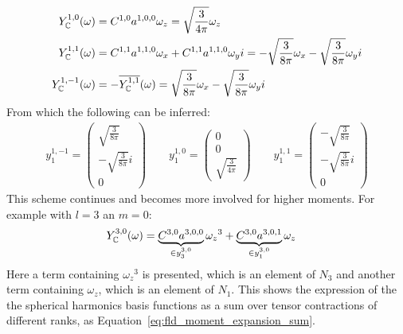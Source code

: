 \begin{align}
Y_{\mathbb{C}}^{1,0}(\omega) &= C^{{1,0}}a^{{1,0,0}}\omega_z = \sqrt{\frac{3}{4\pi}}\omega_z
\\
Y_{\mathbb{C}}^{1,1}(\omega) &= C^{{1,1}}a^{{1,1,0}}\omega_x+C^{{1,1}}a^{{1,1,0}}\omega_yi = -\sqrt{\frac{3}{8\pi}}\omega_x - \sqrt{\frac{3}{8\pi}}\omega_yi
\\
Y_{\mathbb{C}}^{1,-1}(\omega) &= -\overline{Y_{\mathbb{C}}^{1,1}}(\omega)
= \sqrt{\frac{3}{8\pi}}\omega_x - \sqrt{\frac{3}{8\pi}}\omega_yi
\end{align}
From which the following can be inferred:
\begin{align}
y^{1,-1}_1 = \begin{pmatrix}\sqrt{\frac{3}{8\pi}}  \\ -\sqrt{\frac{3}{8\pi}}i \\ 0 \end{pmatrix}
\qquad
y^{1,0}_1 = \begin{pmatrix}0  \\ 0 \\ \sqrt{\frac{3}{4\pi}} \end{pmatrix}
\qquad
y^{1,1}_1 = \begin{pmatrix}-\sqrt{\frac{3}{8\pi}}  \\ -\sqrt{\frac{3}{8\pi}}i \\ 0 \end{pmatrix}
\end{align}
This scheme continues and becomes more involved for higher moments. For example with $l=3$ an $m=0$:
\begin{align}
Y_{\mathbb{C}}^{3,0}(\omega) &= \underbrace{C^{{3,0}}a^{{3,0,0}}}_{\in y^{3,0}_3}{\omega_z}^{3}+\underbrace{C^{{3,0}}a^{{3,0,1}}}_{\in y^{3,0}_1}\omega_z
\end{align}
Here a term containing ${\omega_z}^{3}$ is presented, which is an element of $N_3$ and another term containing $\omega_z$, which is an element of $N_1$. This shows the expression of the the spherical harmonics basis functions as a sum over tensor contractions of different ranks, as Equation~\ref{eq:fld_moment_expansion_sum}.

